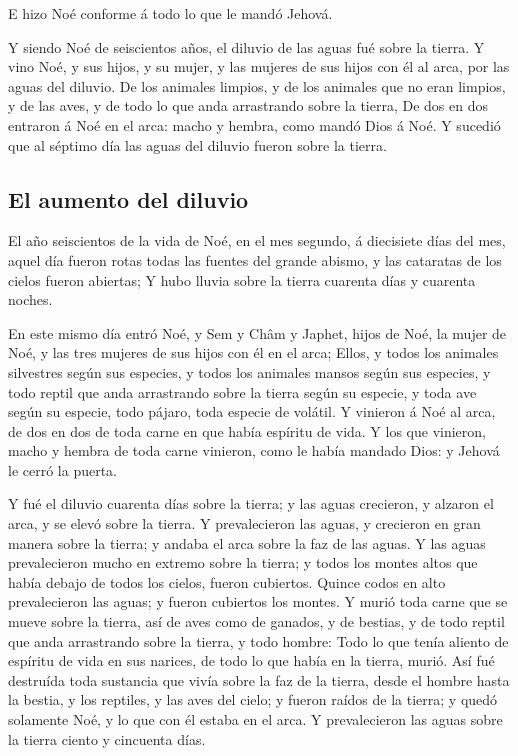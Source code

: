  E hizo Noé conforme á todo lo que le mandó Jehová.

 Y siendo Noé de seiscientos años, el diluvio de las aguas
fué sobre la tierra.  Y vino Noé, y sus hijos, y su mujer,
y las mujeres de sus hijos con él al arca, por las aguas del diluvio.
 De los animales limpios, y de los animales que no eran
limpios, y de las aves, y de todo lo que anda arrastrando sobre la
tierra,  De dos en dos entraron á Noé en el arca: macho y
hembra, como mandó Dios á Noé.  Y sucedió que al séptimo
día las aguas del diluvio fueron sobre la tierra.

\hypertarget{el-aumento-del-diluvio}{%
\subsection{El aumento del diluvio}\label{el-aumento-del-diluvio}}

 El año seiscientos de la vida de Noé, en el mes segundo,
á diecisiete días del mes, aquel día fueron rotas todas las fuentes del
grande abismo, y las cataratas de los cielos fueron abiertas;
 Y hubo lluvia sobre la tierra cuarenta días y cuarenta
noches.

 En este mismo día entró Noé, y Sem y Châm y Japhet,
hijos de Noé, la mujer de Noé, y las tres mujeres de sus hijos con él en
el arca;  Ellos, y todos los animales silvestres según
sus especies, y todos los animales mansos según sus especies, y todo
reptil que anda arrastrando sobre la tierra según su especie, y toda ave
según su especie, todo pájaro, toda especie de volátil. 
Y vinieron á Noé al arca, de dos en dos de toda carne en que había
espíritu de vida.  Y los que vinieron, macho y hembra de
toda carne vinieron, como le había mandado Dios: y Jehová le cerró la
puerta.

 Y fué el diluvio cuarenta días sobre la tierra; y las
aguas crecieron, y alzaron el arca, y se elevó sobre la tierra.
 Y prevalecieron las aguas, y crecieron en gran manera
sobre la tierra; y andaba el arca sobre la faz de las aguas.
 Y las aguas prevalecieron mucho en extremo sobre la
tierra; y todos los montes altos que había debajo de todos los cielos,
fueron cubiertos.  Quince codos en alto prevalecieron las
aguas; y fueron cubiertos los montes.  Y murió toda carne
que se mueve sobre la tierra, así de aves como de ganados, y de bestias,
y de todo reptil que anda arrastrando sobre la tierra, y todo hombre:
 Todo lo que tenía aliento de espíritu de vida en sus
narices, de todo lo que había en la tierra, murió.  Así
fué destruída toda sustancia que vivía sobre la faz de la tierra, desde
el hombre hasta la bestia, y los reptiles, y las aves del cielo; y
fueron raídos de la tierra; y quedó solamente Noé, y lo que con él
estaba en el arca.  Y prevalecieron las aguas sobre la
tierra ciento y cincuenta días.


